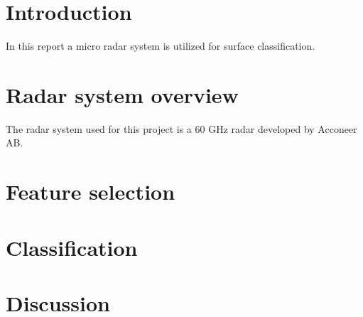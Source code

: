 \documentclass[a4paper, 12pt]{article}
\begin{document}
\section{Introduction}

In this report a micro radar system is utilized for surface classification.

\section{Radar system overview}

The radar system used for this project is a 60 GHz radar developed by Acconeer AB.

\section{Feature selection}

\section{Classification}

\section{Discussion}
\end{document}
